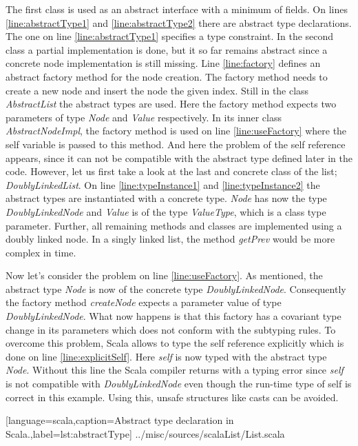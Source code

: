 The first class is used as an abstract interface with a minimum of fields.
On lines \ref{line:abstractType1} and \ref{line:abstractType2} there are
abstract type declarations. The one on line \ref{line:abstractType1}
specifies a type constraint.  In the second class a partial
implementation is done, but it so far remains abstract since a concrete
node implementation is still missing. Line \ref{line:factory} defines
an abstract factory method for the node
creation. The factory method needs to create a new node and insert the
node the given index. Still in the class \emph{AbstractList} the abstract
types are used. Here the factory method expects two parameters of type
\emph{Node} and \emph{Value} respectively. In its inner class \emph{AbstractNodeImpl},
the factory method is used on line \ref{line:useFactory} where the
self variable is passed to this method. And here the problem of the self
reference appears, since it can not be compatible with the abstract type defined
later in the code. However, let us first take a look at the last and concrete class
of the list; \emph{DoublyLinkedList}. On line \ref{line:typeInstance1}
and \ref{line:typeInstance2} the abstract types are instantiated with
a concrete type. \emph{Node} has now the type \emph{DoublyLinkedNode} and
\emph{Value} is of the type \emph{ValueType}, which is a class type parameter. Further, all
remaining methods and classes are implemented using a doubly linked node.
In a singly linked list, the method \emph{getPrev} would be more complex
in time.

Now let's consider the problem on line \ref{line:useFactory}. As
mentioned, the abstract type \emph{Node} is now of the concrete
type \emph{DoublyLinkedNode}. Consequently the factory
method \emph{createNode} expects a parameter value of type
\emph{DoublyLinkedNode}. What now happens is that this factory has a
covariant type change in its parameters which does not conform with the
subtyping rules. To overcome this problem, Scala allows to type the
self reference explicitly which is done on line \ref{line:explicitSelf}.
Here \emph{self} is now typed with the abstract type \emph{Node}. Without this
line the Scala compiler returns with a typing error since \emph{self} is not
compatible with \emph{DoublyLinkedNode} even though the run-time
type of self is correct in this example. Using this, unsafe structures
like casts can be avoided.


[language=scala,caption=Abstract type declaration in Scala.,label=lst:abstractType]
{../misc/sources/scalaList/List.scala}


